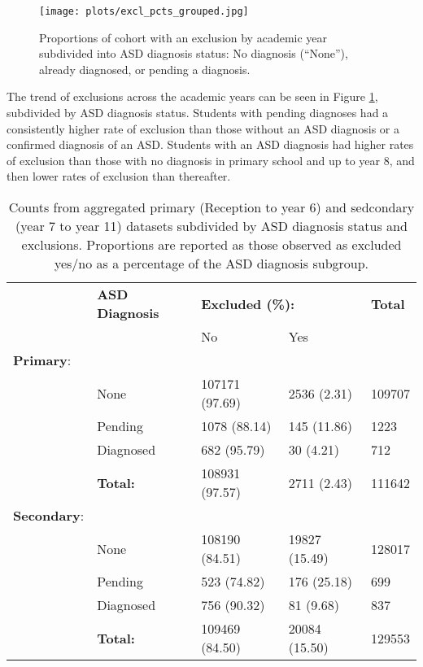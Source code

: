 \documentclass[
]{article}
\begin{document}
\begin{figure}[H]
\centering
\texttt{[image: plots/excl\_pcts\_grouped.jpg]}
\caption{Proportions of cohort with an exclusion by academic year subdivided into ASD diagnosis status: No diagnosis (``None''), already diagnosed, or pending a diagnosis.}
\label{fig:excl_pcts}
\end{figure}

The trend of exclusions across the academic years can be seen in Figure
\ref{fig:excl_pcts}, subdivided by ASD diagnosis status. Students with
pending diagnoses had a consistently higher rate of exclusion than those
without an ASD diagnosis or a confirmed diagnosis of an ASD. Students
with an ASD diagnosis had higher rates of exclusion than those with no
diagnosis in primary school and up to year 8, and then lower rates of
exclusion than thereafter.

\begin{table}[H]
\centering
\renewcommand*{\arraystretch}{1.2}
\begin{scriptsize}\begin{tabular}{lllll}
\toprule
& \textbf{ASD Diagnosis} & \multicolumn{2}{l}{\textbf{Excluded (\%):}} & \textbf{Total} \\
& & No & Yes & \\
\midrule
\textbf{Primary}: & & & & \\
& None & 107171 (97.69) & 2536 (2.31) & 109707 \\
& Pending & 1078 (88.14) & 145 (11.86) & 1223 \\
& Diagnosed & 682 (95.79) & 30 (4.21) & 712 \\[1mm]
& \textbf{Total:} & 108931 (97.57) & 2711 (2.43) & 111642 \\
\textbf{Secondary}: & & & & \\
& None & 108190 (84.51) & 19827 (15.49) & 128017 \\
& Pending & 523 (74.82) & 176 (25.18) & 699 \\
& Diagnosed & 756 (90.32) & 81 (9.68) & 837 \\[1mm]
& \textbf{Total:} & 109469 (84.50) & 20084 (15.50) & 129553 \\
\bottomrule
\end{tabular}\end{scriptsize}
\caption{Counts from aggregated primary (Reception to year 6) and sedcondary (year 7 to year 11) datasets subdivided by ASD diagnosis status and exclusions. Proportions are reported as those observed as excluded yes/no as a percentage of the ASD diagnosis subgroup.}
\label{tab:table_2}
\end{table}
\end{document}
